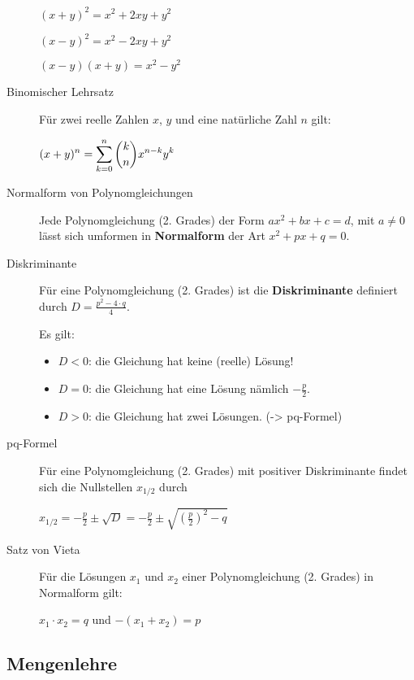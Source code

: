 \documentclass[9pt,ngerman,a4paper,landscape]{scrartcl}
\providecommand{\tightlist}{%
  \setlength{\itemsep}{0pt}\setlength{\parskip}{0pt}}
\begin{document}
\begin{multicols}{3}
\begin{description}
\(\displaystyle (x+y)^2 = x^2 + 2 xy + y^2\)

\(\displaystyle (x-y)^2 = x^2 - 2 xy + y^2\)

\(\displaystyle (x-y)(x+y) = x^2-y^2\)
\item[Binomischer Lehrsatz]
Für zwei reelle Zahlen \(x\), \(y\) und eine natürliche Zahl \(n\) gilt:

\(\displaystyle (x+y)^n = \sum\limits_{k=0}^{n} \dbinom{k}{n} x^{n-k}y^{k}\)
\item[Normalform von Polynomgleichungen]
Jede Polynomgleichung (2. Grades) der Form \(a x^2+ bx +c = d\), mit
\(a\neq 0\) lässt sich umformen in \textbf{Normalform} der Art
\(x^2+px+q=0\).
\item[Diskriminante]
Für eine Polynomgleichung (2. Grades) ist die \textbf{Diskriminante}
definiert durch \(D=\frac{p^2-4\cdot q}{4}\).

Es gilt:

\begin{itemize}
\tightlist
\item
  \(D < 0\): die Gleichung hat keine (reelle) Lösung!
\end{itemize}

\begin{itemize}
\tightlist
\item
  \(D = 0\): die Gleichung hat eine Lösung nämlich \(-\frac{p}{2}\).
\end{itemize}

\begin{itemize}
\tightlist
\item
  \(D > 0\): die Gleichung hat zwei Lösungen. (-\textgreater{}
  pq-Formel)
\end{itemize}
\item[pq-Formel]
Für eine Polynomgleichung (2. Grades) mit positiver Diskriminante findet
sich die Nullstellen \(x_{1/2}\) durch

\(\displaystyle x_{1/2} = -\frac{p}{2} \pm \sqrt{D} = -\frac{p}{2} \pm \sqrt{\left(\frac{p}{2}\right)^2 - q}\)
\item[Satz von Vieta]
Für die Lösungen \(x_1\) und \(x_2\) einer Polynomgleichung (2. Grades)
in Normalform gilt:

\(x_1 \cdot x_2 = q\) und \(-(x_1+x_2)=p\)
\end{description}

\hypertarget{mengenlehre}{%
\subsection{Mengenlehre}\label{mengenlehre}}


\end{multicols}
\end{document}
